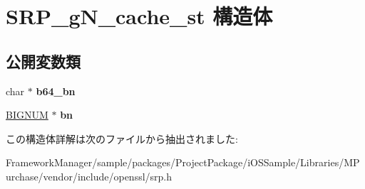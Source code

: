 \hypertarget{struct_s_r_p__g_n__cache__st}{}\section{S\+R\+P\+\_\+g\+N\+\_\+cache\+\_\+st 構造体}
\label{struct_s_r_p__g_n__cache__st}
\subsection*{公開変数類}
\begin{DoxyCompactItemize}
\item 
\hypertarget{struct_s_r_p__g_n__cache__st_a1dd9c70bac46d3829e31d89c4989617b}{}char $\ast$ {\bfseries b64\+\_\+bn}\label{struct_s_r_p__g_n__cache__st_a1dd9c70bac46d3829e31d89c4989617b}

\item 
\hypertarget{struct_s_r_p__g_n__cache__st_a9dc3091a4c8af3b6b5747ba3f455c264}{}\hyperlink{structbignum__st}{B\+I\+G\+N\+U\+M} $\ast$ {\bfseries bn}\label{struct_s_r_p__g_n__cache__st_a9dc3091a4c8af3b6b5747ba3f455c264}

\end{DoxyCompactItemize}


この構造体詳解は次のファイルから抽出されました\+:\begin{DoxyCompactItemize}
\item 
Framework\+Manager/sample/packages/\+Project\+Package/i\+O\+S\+Sample/\+Libraries/\+M\+Purchase/vendor/include/openssl/srp.\+h\end{DoxyCompactItemize}
